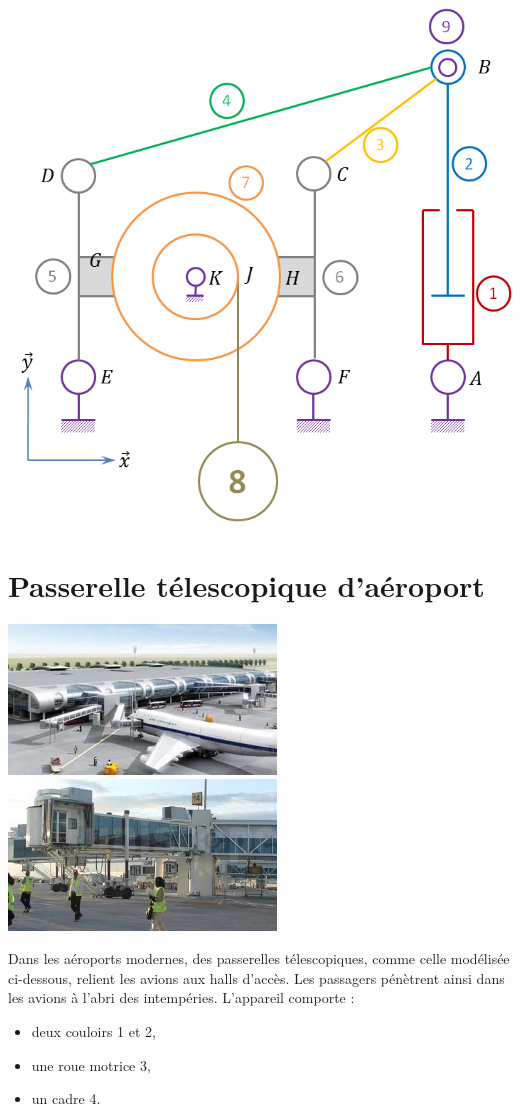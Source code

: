 \documentclass[10pt]{article}
\begin{document}
\begin{center}
\includegraphics[width=.55\textwidth]{images/grue2}
\end{center}

\newpage

\section*{Passerelle télescopique d'aéroport}
\setcounter{subparagraph}{0}
\begin{center}
\includegraphics[height=4cm]{images/pas1} \hspace{.5cm}
\includegraphics[height=4cm]{images/pas2}
\end{center}

Dans les aéroports modernes, des passerelles télescopiques, comme celle modélisée ci-dessous, relient les avions aux halls d’accès. Les passagers pénètrent ainsi dans les avions à l’abri des intempéries.
L’appareil comporte :
\begin{itemize}
\item deux couloirs 1 et 2,
\item une roue motrice 3,
\item un cadre 4.
\end{itemize}
\end{document}
